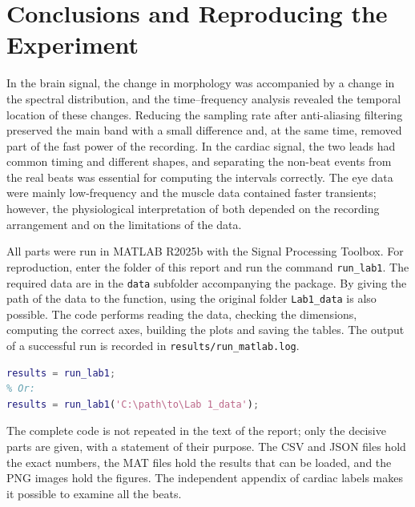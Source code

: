 \section{Conclusions and Reproducing the Experiment}

In the brain signal, the change in morphology was accompanied by a change in the spectral distribution, and the time--frequency analysis revealed the temporal location of these changes. Reducing the sampling rate after anti-aliasing filtering preserved the main band with a small difference and, at the same time, removed part of the fast power of the recording. In the cardiac signal, the two leads had common timing and different shapes, and separating the non-beat events from the real beats was essential for computing the intervals correctly. The eye data were mainly low-frequency and the muscle data contained faster transients; however, the physiological interpretation of both depended on the recording arrangement and on the limitations of the data.

All parts were run in MATLAB R2025b with the Signal Processing Toolbox. For reproduction, enter the folder of this report and run the command \texttt{run\_lab1}. The required data are in the \texttt{data} subfolder accompanying the package. By giving the path of the data to the function, using the original folder \texttt{Lab1\_data} is also possible. The code performs reading the data, checking the dimensions, computing the correct axes, building the plots and saving the tables. The output of a successful run is recorded in \texttt{results/run\_matlab.log}.

\begin{lstlisting}[language=Matlab]
results = run_lab1;
% Or:
results = run_lab1('C:\path\to\Lab 1_data');
\end{lstlisting}

The complete code is not repeated in the text of the report; only the decisive parts are given, with a statement of their purpose. The CSV and JSON files hold the exact numbers, the MAT files hold the results that can be loaded, and the PNG images hold the figures. The independent appendix of cardiac labels makes it possible to examine all the beats.
